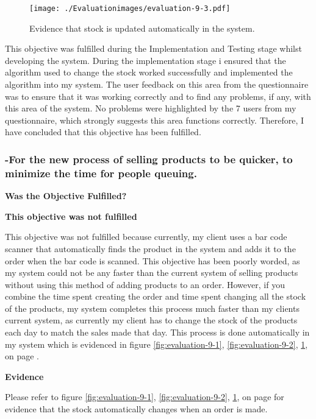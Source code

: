 \begin{figure}[H]
\caption{Evidence that stock is updated automatically in the system.} \label{fig:evaluation-9-3}
\hfill\texttt{[image: ./Evaluationimages/evaluation-9-3.pdf]}
\end{figure}

This objective was fulfilled during the Implementation and Testing stage whilst developing the system. During the implementation stage i ensured that the algorithm used to change the stock worked successfully and implemented the algorithm into my system. The user feedback on this area from the questionnaire was to ensure that it was working correctly and to find any problems, if any, with this area of the system. No problems were highlighted by the 7 users from my questionnaire, which strongly suggests this area functions correctly. Therefore, I have concluded that this objective has been fulfilled.



\pagebreak
\subsubsection{-For the new process of selling products to be quicker, to minimize the time for people queuing.}
\textbf{Was the Objective Fulfilled?} \newline

\textbf{\large{This objective was not fulfilled}}

This objective was not fulfilled because currently, my client uses a bar code scanner that automatically finds the product in the system and adds it to the order when the bar code is scanned. This objective has been poorly worded, as my system could not be any faster than the current system of selling products without using this method of adding products to an order. However, if you combine the time spent creating the order and time spent changing all the stock of the products, my system completes this process much faster than my clients current system, as currently my client has to change the stock of the products each day to match the sales made that day. This process is done automatically in my system which is evidenced in figure \ref{fig:evaluation-9-1}, \ref{fig:evaluation-9-2}, \ref{fig:evaluation-9-3}, on  page \pageref{automatic-stock-evidence}. \newline

\textbf{Evidence} \newline

Please refer to figure \ref{fig:evaluation-9-1}, \ref{fig:evaluation-9-2}, \ref{fig:evaluation-9-3}, on  page \pageref{automatic-stock-evidence} for evidence that the stock automatically changes when an order is made.

